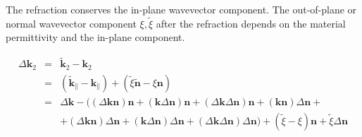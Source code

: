 \documentclass[12pt,a4paper,twoside,openright,BCOR10mm,headsepline,titlepage,abstracton,chapterprefix,final]{scrreprt}
\newcommand\Vector[1]{{\mathbf{#1}}}
\newcommand\wavenumber{k}
\newcommand\Wavevector{\Vector{\wavenumber}}
\begin{document}
The refraction conserves the in-plane wavevector component. 
The out-of-plane or normal wavevector component $\xi, \tilde{\xi}$ after the refraction depends on the material permittivity and the in-plane component.

\begin{eqnarray}
 \Delta\Wavevector_2 &=& \tilde{\Wavevector}_2 - \Wavevector_2 \\
 &=& ( \tilde{\Wavevector}_{\parallel} - \Wavevector_{\parallel} ) + ( \tilde{\xi} \tilde{\Vector{n}} - \xi \Vector{n} ) \\
 &=& \Delta\Wavevector - 
 \bigg(
   (\Delta\Wavevector \Vector{n} )\Vector{n} 
   + (\Wavevector \Delta\Vector{n} )\Vector{n}  + (\Delta\Wavevector \Delta\Vector{n} )\Vector{n} 
   + (\Wavevector \Vector{n} )\Delta\Vector{n}  + 
  \nonumber \\ &&
   + (\Delta\Wavevector \Vector{n} )\Delta\Vector{n} 
   + (\Wavevector \Delta\Vector{n} )\Delta\Vector{n}
   + (\Delta\Wavevector \Delta\Vector{n} )\Delta\Vector{n}
 \bigg) 
 + ( \tilde{\xi} - \xi ) \Vector{n} + \tilde{\xi} \Delta\Vector{n}
\end{eqnarray}
\end{document}
